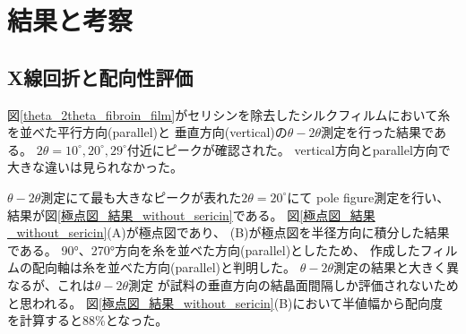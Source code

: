 \documentclass[dvipdfmx,12pt,a4paper]{jreport}
\begin{document}
	\chapter{結果と考察}
			\section{X線回折と配向性評価}
			図\ref{theta_2theta_fibroin_film}がセリシンを除去したシルクフィルムにおいて糸を並べた平行方向(parallel)と
			垂直方向(vertical)の$\theta - 2\theta$測定を行った結果である。
			$2\theta = 10^{\circ}, 20^{\circ}, 29^{\circ}$付近にピークが確認された。
			vertical方向とparallel方向で大きな違いは見られなかった。
			
			$\theta - 2\theta $測定にて最も大きなピークが表れた$2\theta=20^{\circ}$にて
			pole figure測定を行い、結果が図\ref{極点図_結果_without_sericin}である。
			図\ref{極点図_結果_without_sericin}(A)が極点図であり、
			(B)が極点図を半径方向に積分した結果である。
			90°、270°方向を糸を並べた方向(parallel)としたため、
			作成したフィルムの配向軸は糸を並べた方向(parallel)と判明した。
			$\theta-2\theta$測定の結果と大きく異なるが、これは$\theta-2\theta$測定
			が試料の垂直方向の結晶面間隔しか評価されないためと思われる。
			図\ref{極点図_結果_without_sericin}(B)において半値幅から配向度
			を計算すると88\%となった。
\end{document}
